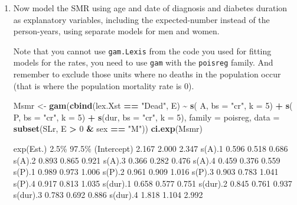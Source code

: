 \documentclass[
]{book}
\newenvironment{Shaded}{\begin{snugshade}}{\end{snugshade}}
\newcommand{\AttributeTok}[1]{\textcolor[rgb]{0.13,0.29,0.53}{#1}}
\newcommand{\DecValTok}[1]{\textcolor[rgb]{0.00,0.00,0.81}{#1}}
\newcommand{\FunctionTok}[1]{\textcolor[rgb]{0.13,0.29,0.53}{\textbf{#1}}}
\newcommand{\NormalTok}[1]{#1}
\newcommand{\OtherTok}[1]{\textcolor[rgb]{0.56,0.35,0.01}{#1}}
\newcommand{\SpecialCharTok}[1]{\textcolor[rgb]{0.81,0.36,0.00}{\textbf{#1}}}
\newcommand{\StringTok}[1]{\textcolor[rgb]{0.31,0.60,0.02}{#1}}
\begin{document}
\begin{enumerate}
\def\labelenumi{\arabic{enumi}.}
\setcounter{enumi}{13}
\item
  Now model the SMR using age and date of diagnosis and diabetes
  duration as explanatory variables, including the expected-number
  instead of the person-years, using separate models for
  men and women.

  Note that you cannot use \texttt{gam.Lexis} from the code you used for
  fitting models for the rates, you need to use \texttt{gam} with
  the \texttt{poisreg} family. And remember to exclude those units
  where no deaths in the population occur (that is where the
  population mortality rate is 0).

\begin{Shaded}
\begin{Highlighting}[]
\NormalTok{Msmr }\OtherTok{\textless{}{-}} \FunctionTok{gam}\NormalTok{(}\FunctionTok{cbind}\NormalTok{(lex.Xst }\SpecialCharTok{==} \StringTok{"Dead"}\NormalTok{, E) }
            \SpecialCharTok{\textasciitilde{}} \FunctionTok{s}\NormalTok{(  A, }\AttributeTok{bs =} \StringTok{"cr"}\NormalTok{, }\AttributeTok{k =} \DecValTok{5}\NormalTok{) }\SpecialCharTok{+}
              \FunctionTok{s}\NormalTok{(  P, }\AttributeTok{bs =} \StringTok{"cr"}\NormalTok{, }\AttributeTok{k =} \DecValTok{5}\NormalTok{) }\SpecialCharTok{+}
              \FunctionTok{s}\NormalTok{(dur, }\AttributeTok{bs =} \StringTok{"cr"}\NormalTok{, }\AttributeTok{k =} \DecValTok{5}\NormalTok{),}
            \AttributeTok{family =}\NormalTok{ poisreg,}
              \AttributeTok{data =} \FunctionTok{subset}\NormalTok{(SLr, E }\SpecialCharTok{\textgreater{}} \DecValTok{0} \SpecialCharTok{\&}\NormalTok{ sex }\SpecialCharTok{==} \StringTok{"M"}\NormalTok{))}
\FunctionTok{ci.exp}\NormalTok{(Msmr)}
\end{Highlighting}
\end{Shaded}

\begin{Shaded}
\begin{Highlighting}[]
\NormalTok{            exp(Est.)  2.5\% 97.5\%}
\NormalTok{(Intercept)     2.167 2.000 2.347}
\NormalTok{s(A).1          0.596 0.518 0.686}
\NormalTok{s(A).2          0.893 0.865 0.921}
\NormalTok{s(A).3          0.366 0.282 0.476}
\NormalTok{s(A).4          0.459 0.376 0.559}
\NormalTok{s(P).1          0.989 0.973 1.006}
\NormalTok{s(P).2          0.961 0.909 1.016}
\NormalTok{s(P).3          0.903 0.783 1.041}
\NormalTok{s(P).4          0.917 0.813 1.035}
\NormalTok{s(dur).1        0.658 0.577 0.751}
\NormalTok{s(dur).2        0.845 0.761 0.937}
\NormalTok{s(dur).3        0.783 0.692 0.886}
\NormalTok{s(dur).4        1.818 1.104 2.992}
\end{Highlighting}
\end{Shaded}


\end{enumerate}
\end{document}
